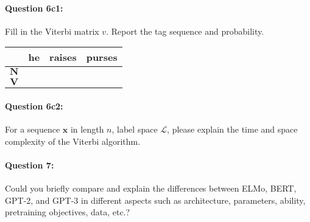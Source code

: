 \documentclass[10pt]{article}
\begin{document}
\paragraph{Question 6c1:} Fill in the Viterbi matrix $v$. Report the tag sequence and probability.

\begin{table}[H]
  \centering
  \begin{tabular}{|c|c|c|c|}
    \hline&
    he   & raises & purses \\
    \hline
    $\mathbf{N}$ &   &   &   \\
    \hline
    $\mathbf{V}$ &   &   &   \\
    \hline
  \end{tabular}

\end{table}

\paragraph{Question 6c2:} For a sequence $\boldsymbol{x}$ in length $n$, label space $\mathcal{L}$, please explain the time and space complexity of the Viterbi algorithm.



\newpage

\paragraph{Question 7:} Could you briefly compare and explain the differences between ELMo, BERT, GPT-2, and GPT-3 in different aspects such as architecture, parameters, ability, pretraining objectives, data, etc.?
\end{document}
